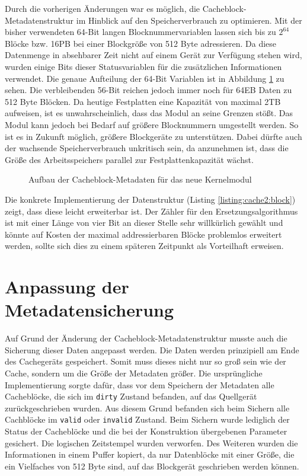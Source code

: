 Durch die vorherigen Änderungen war es möglich, die Cacheblock-Metadatenstruktur im Hinblick auf den
Speicherverbrauch zu optimieren. Mit der bisher verwendeten 64-Bit langen Blocknummervariablen lassen sich bis zu $2^{64}$ Blöcke bzw. 16PB bei einer Blockgröße
von 512 Byte adressieren. Da diese Datenmenge in absehbarer Zeit nicht auf einem Gerät zur Verfügung stehen wird, wurden einige Bits dieser Statusvariablen für
die zusätzlichen Informationen verwendet. Die genaue Aufteilung der 64-Bit Variablen ist in Abbildung \ref{img:block} zu sehen. Die verbleibenden 56-Bit reichen
jedoch immer noch für 64EB Daten zu 512 Byte Blöcken. Da heutige Festplatten eine Kapazität von maximal 2TB aufweisen, ist es unwahrscheinlich, dass das Modul an
seine Grenzen stößt. Das Modul kann jedoch bei Bedarf auf größere Blocknummern umgestellt werden. So ist es in Zukunft möglich, größere Blockgeräte
zu unterstützen. Dabei dürfte auch der wachsende Speicherverbrauch unkritisch sein, da anzunehmen ist, dass die Größe des Arbeitsspeichers parallel zur
Festplattenkapazität wächst.

\begin{figure}[H]\centering
    \caption[Aufbau der Cacheblock-Metadaten für das neue Kernelmodul]{Aufbau der Cacheblock-Metadaten für das neue Kernelmodul}
    \label{img:block}
\end{figure}

Die konkrete Implementierung der Datenstruktur (Listing \ref{listing:cache2:block}) zeigt, dass diese leicht erweiterbar ist. Der Zähler für den
Ersetzungsalgorithmus ist mit einer Länge von vier Bit an dieser Stelle sehr willkürlich gewählt und könnte auf Kosten der maximal addressierbaren Blöcke
problemlos erweitert werden, sollte sich dies zu einem späteren Zeitpunkt als Vorteilhaft erweisen.



\section{Anpassung der Metadatensicherung}
\label{chap6:save}

Auf Grund der Änderung der Cacheblock-Metadatenstruktur musste auch die Sicherung dieser Daten angepasst werden. Die Daten werden prinzipiell am Ende des
Cachegeräts gespeichert. Somit muss dieses nicht nur so groß sein wie der Cache, sondern um die Größe der Metadaten größer. Die ursprüngliche Implementierung
sorgte dafür, dass vor dem Speichern der Metadaten alle Cacheblöcke, die sich im \texttt{dirty} Zustand befanden, auf das Quellgerät zurückgeschrieben wurden.
Aus diesem Grund befanden sich beim Sichern alle Cachblöcke im \texttt{valid} oder \texttt{invalid} Zustand. Beim Sichern wurde lediglich der Status der
Cacheblöcke und die bei der Konstruktion übergebenen Parameter gesichert. Die logischen Zeitstempel wurden verworfen. Des Weiteren wurden die Informationen in
einem Puffer kopiert, da nur Datenblöcke mit einer Größe, die ein Vielfaches von 512 Byte sind, auf das Blockgerät geschrieben werden können.

